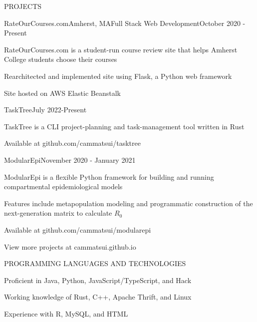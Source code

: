 \documentclass{article}
\begin{document}
\begin{bigsection}{PROJECTS}
    \begin{sectionitem}{RateOurCourses.com}{Amherst, MA}{Full Stack Web Development}{October 2020 - Present}
        \item RateOurCourses.com is a student-run course review site that helps Amherst College students choose their
                courses
        \item Rearchitected and implemented site using Flask, a Python web framework
        \item Site hosted on AWS Elastic Beanstalk
    \end{sectionitem}

    \begin{litesectionitem}{TaskTree}{July 2022-Present}
        \item TaskTree is a CLI project-planning and task-management tool written in Rust
        \item Available at github.com/cammatsui/tasktree
    \end{litesectionitem}

    \begin{litesectionitem}{ModularEpi}{November 2020 - January 2021}
        \item ModularEpi is a flexible Python framework for building and running compartmental epidemiological models
        \item Features include metapopulation modeling and programmatic construction of the next-generation matrix to
            calculate $R_0$
        \item Available at github.com/cammatsui/modularepi
    \end{litesectionitem}
\end{bigsection}
\begin{adjustwidth}{0.2cm}{}View more projects at cammatsui.github.io\end{adjustwidth}
\vspace{0.1in}


\begin{litebigsection}{PROGRAMMING LANGUAGES AND TECHNOLOGIES}
    \item Proficient in Java, Python, JavaScript/TypeScript, and Hack
    \item Working knowledge of Rust, C++, Apache Thrift, and Linux
    \item Experience with R, MySQL, and HTML
\end{litebigsection}
\end{document}
